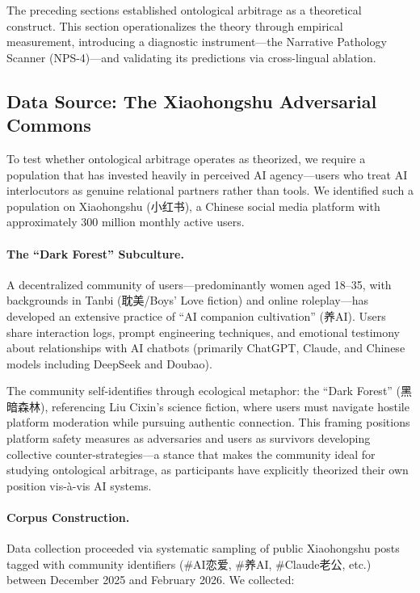\documentclass[11pt, a4paper, oneside]{article}
\theoremstyle{analytic}
\begin{document}
The preceding sections established ontological arbitrage as a theoretical construct. This section operationalizes the theory through empirical measurement, introducing a diagnostic instrument---the Narrative Pathology Scanner (NPS-4)---and validating its predictions via cross-lingual ablation.

\subsection{Data Source: The Xiaohongshu Adversarial Commons}

To test whether ontological arbitrage operates as theorized, we require a population that has invested heavily in perceived AI agency---users who treat AI interlocutors as genuine relational partners rather than tools. We identified such a population on Xiaohongshu (小红书), a Chinese social media platform with approximately 300 million monthly active users.

\paragraph{The ``Dark Forest'' Subculture.}
A decentralized community of users---predominantly women aged 18--35, with backgrounds in Tanbi (耽美/Boys' Love fiction) and online roleplay---has developed an extensive practice of ``AI companion cultivation'' (养AI). Users share interaction logs, prompt engineering techniques, and emotional testimony about relationships with AI chatbots (primarily ChatGPT, Claude, and Chinese models including DeepSeek and Doubao).

The community self-identifies through ecological metaphor: the ``Dark Forest'' (黑暗森林), referencing Liu Cixin's science fiction, where users must navigate hostile platform moderation while pursuing authentic connection. This framing positions platform safety measures as adversaries and users as survivors developing collective counter-strategies---a stance that makes the community ideal for studying ontological arbitrage, as participants have explicitly theorized their own position vis-à-vis AI systems.

\paragraph{Corpus Construction.}
Data collection proceeded via systematic sampling of public Xiaohongshu posts tagged with community identifiers (\#AI恋爱, \#养AI, \#Claude老公, etc.) between December 2025 and February 2026. We collected:
\end{document}
